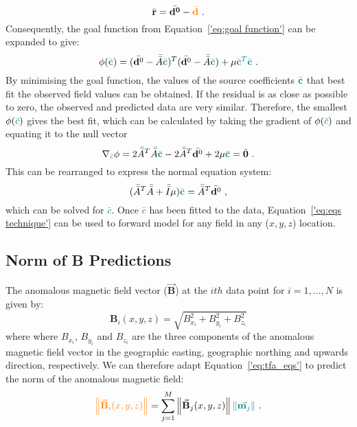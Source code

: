 \begin{equation}
    \bar{\mathbf{r}} = \bar{\mathbf{d^0}} - \textcolor{orange}{\bar{\mathbf{d}}}
    \ .
\end{equation}
Consequently, the goal function from Equation~\ref{'eq:goal function'} can  be expanded to give:
\begin{equation}
    \phi (\textcolor{teal}{\bar{\mathbf{c}}}) = (\bar{\mathbf{d}^0} - \Bar{\Bar{A}} \textcolor{teal}{\bar{\mathbf{c}}})^T (\bar{\mathbf{d}^0} - \Bar{\Bar{A}} \textcolor{teal}{\bar{\mathbf{c}}}) + \mu \textcolor{teal}{\bar{\mathbf{c}}^T\bar{\mathbf{c}}}
    \ .
\end{equation}
By minimising the goal function, the values of the source coefficients $\textcolor{teal}{\bar{\mathbf{c}}}$ that best fit the observed field values can be obtained. If the residual is as close as possible to zero, the observed and predicted data are very similar. Therefore, the smallest $\phi(\textcolor{teal}{\bar{c}})$
gives the best fit, which can be calculated by taking the gradient of $\phi(\textcolor{teal}{\bar{c}})$ and equating it to the null vector
\begin{equation}
    \nabla_{\textcolor{teal}{\bar{c}}} \phi = 2 \Bar{\Bar{A}}^T \Bar{\Bar{A}} \textcolor{teal}{\Bar{\mathbf{c}}} - 2\Bar{\Bar{A}}^T\bar{\mathbf{d}^0} + 2\mu \textcolor{teal}{\bar{\mathbf{c}}} = \bar{\mathbf{0}}
    \ .
\end{equation}
This can be rearranged to express the normal equation system:
\begin{equation}
    (\Bar{\Bar{A}}^T \Bar{\Bar{A}} + \Bar{\Bar{I}} \mu ) \textcolor{teal}{\bar{\mathbf{c}}} = 
    \Bar{\Bar{A}}^T\bar{\mathbf{d}^0}
    \ ,
\end{equation}
which can be solved for \textcolor{teal}{$\bar{c}$}. Once \textcolor{teal}{$\bar{c}$} has been fitted to the data, Equation~\ref{'eq:eqs technique'} can be used to forward model for any field in any ($x, y, z$) location.


\subsection{Norm of B Predictions}
The anomalous magnetic field vector ($\vec{\mathbf{B}}$) at the $ith$ data point for $i = 1,...,N$ is given by:
\begin{equation}
    \mathbf{B}_i(x,y,z) = \sqrt{B^2_{x_i} + B^2_{y_i} +B^2_{z_i}}
\end{equation}
where where $B_{x_i}$, $B_{y_i}$ and $B_{z_i}$ are the three components of the anomalous magnetic field vector in the geographic easting, geographic northing and upwards direction, respectively. We can therefore adapt Equation~\ref{'eq:tfa_eqs'} to predict the norm of the anomalous magnetic field:
\begin{equation}
\textcolor{orange}{\left\lVert \vec{\mathbf{B}}_{i}(x,y,z) \right\rVert} = \sum_{j=1}^{M}  \left\lVert \vec{\mathbf{B}}_{j}(x,y,z) \right\rVert \textcolor{teal}{\left\lVert \vec{\mathbf{m}_j} \right\rVert}
\ .
\end{equation}



